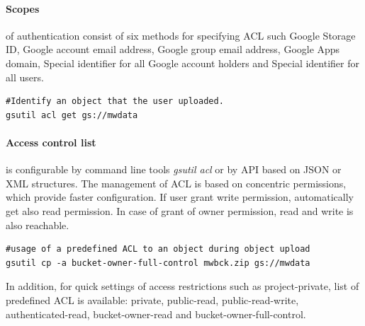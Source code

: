 \documentclass[a4paper,12pt,oneside]{report}
\begin{document}
	\paragraph{Scopes}\label{par:scopes} of authentication consist of six methods for 
	specifying ACL such  Google Storage ID, Google account email address, Google 
	group email address, Google Apps domain, Special identifier for all Google 
	account holders and Special identifier for all users.
	
	\begin{footnotesize}
		\begin{lstlisting}[style=mybash]
#Identify an object that the user uploaded.
gsutil acl get gs://mwdata
		\end{lstlisting}\end{footnotesize}
	
	
	\paragraph{Access control list}\label{acl} is configurable by command line tools
	\textit{gsutil acl} or by API based on JSON or XML structures. The management of ACL is based on concentric permissions, which provide faster configuration. If user grant 
	write permission, automatically get also read permission. In case of grant of owner 
	permission, read and write is also reachable.\begin{footnotesize}
		\begin{lstlisting}[style=mybash]
#usage of a predefined ACL to an object during object upload
gsutil cp -a bucket-owner-full-control mwbck.zip gs://mwdata
		\end{lstlisting}
	\end{footnotesize}
	In addition, for quick settings of access
	restrictions such as project-private, list of predefined ACL is available:
	private, public-read, public-read-write, authenticated-read, 
	bucket-owner-read and bucket-owner-full-control.
	
	
	
	
	
\end{document}
